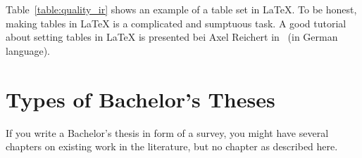 Table~\ref{table:quality_ir} shows an example of a table set in
\LaTeX. To be honest, making tables in {\LaTeX} is a complicated and
sumptuous task. A good tutorial about setting tables in {\LaTeX} is
presented bei Axel Reichert in~\cite{reichert:1999} (in German
language).

\section{Types of Bachelor's Theses}

If you write a Bachelor's thesis in form of a survey, you might have
several chapters on existing work in the literature, but no chapter
as described here.



